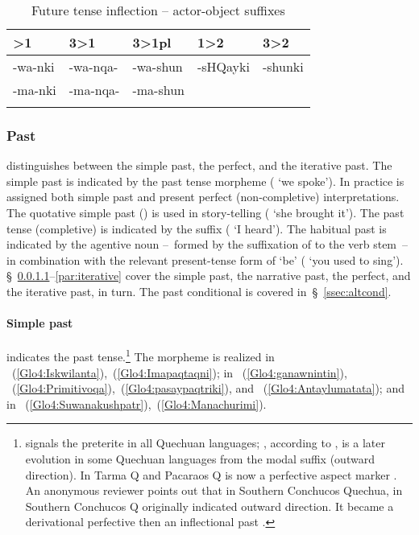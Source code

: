 \begin{table}[!ht]
\small\centering
\caption{Future tense inflection -- actor-object suffixes}\label{Tab17b}
\begin{tabular}{lllll}
\lsptoprule
2>1	&	3>1	&	3>1pl	&	1>2	&	3>2	\\
\midrule
-wa-nki\tss{\AMV,\LT}	
&	-wa-nqa-\uo\tss{\AMV,\LT}	
&	-wa-shun\tss{\AMV,\LT}	
&	-sHQayki	
& -shunki\\
-ma-nki\tss{\ACH,\CH,\SP}	
&	-ma-nqa-\uo\tss{\ACH,\CH,\SP}	
&	-ma-shun\tss{\ACH,\CH,\SP}	
&	 	
& 	\\
\lspbottomrule
\end{tabular}
\end{table}

\subsubsection{Past}\label{ssec:past}
\SYQ{} distinguishes between the simple past, the perfect, and the iterative past. The simple past is indicated by the past tense morpheme  ( ‘we spoke’). In practice  is assigned both simple past and present perfect (non-completive) interpretations. The quotative simple past () is used in story-telling ( ‘she brought it’). The past tense (completive) is indicated by the suffix  ( ‘I heard’). The habitual past is indicated by the agentive noun --~formed by the suffixation of  to the verb stem~-- in combination with the relevant present-tense form of  ‘be’ (  ‘you used to sing’). §~\ref{par:simplepast}--\ref{par:iterative} cover the simple past, the narrative past, the perfect, and the iterative past, in turn. The past conditional is covered in~§~\ref{ssec:altcond}.

\paragraph{Simple past }\label{par:simplepast}
 indicates the past tense.\footnote{ signals the preterite in all Quechuan languages; , according to \citet{CerroP87}, is a later evolution in some Quechuan languages from the modal suffix  (outward direction). In Tarma Q and Pacaraos Q  is now a perfective aspect marker \citet[18--29]{Adelaar88}. An anonymous reviewer points out that in Southern Conchucos Quechua,  in Southern Conchucos Q originally indicated outward direction. It became a derivational perfective then an inflectional past \citep[see][192--197]{Hintz}.} The morpheme is realized  in \AMV{}~(\ref{Glo4:Iskwilanta}),~(\ref{Glo4:Imapaqtaqni});  in \ACH{}~(\ref{Glo4:ganawnintin}), \LT{}~(\ref{Glo4:Primitivoqa}),~(\ref{Glo4:pasaypaqtriki}), and \SP{}~(\ref{Glo4:Antaylumatata}); and  in \CH{}~(\ref{Glo4:Suwanakushpatr}),~(\ref{Glo4:Manachurimi}).\\


